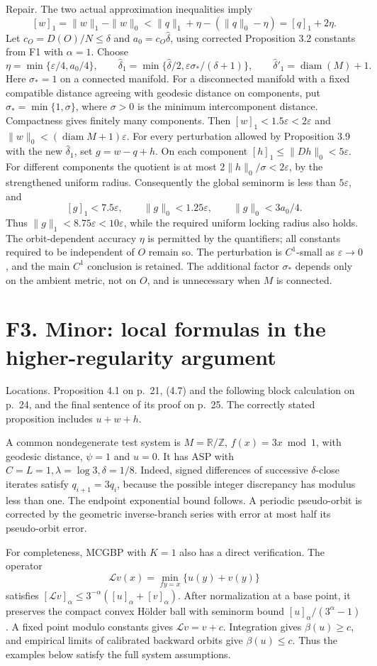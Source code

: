 \documentclass[10pt]{article}
\begin{document}
Repair. The two actual approximation inequalities imply \[[w]_1=\|w\|_1-\|w\|_0
 <\|q\|_1+\eta-(\|q\|_0-\eta)
 =[q]_1+2\eta.\] Let \(c_O=D(O)/N\le\delta\) and \(a_0=c_O\widehat\delta\), using corrected Proposition 3.2 constants from F1 with \(\alpha=1\). Choose \[\eta=\min\{\varepsilon/4,a_0/4\},\qquad
 \widehat\delta_1=\min\{\widehat\delta/2,\varepsilon\sigma_*/(\delta+1)\},
 \qquad \widehat\delta'_1=\operatorname{diam}(M)+1.\] Here \(\sigma_*=1\) on a connected manifold. For a disconnected manifold with a fixed compatible distance agreeing with geodesic distance on components, put \(\sigma_*=\min\{1,\sigma\}\), where \(\sigma>0\) is the minimum intercomponent distance. Compactness gives finitely many components. Then \([w]_1<1.5\varepsilon<2\varepsilon\) and \(\|w\|_0<(\operatorname{diam}M+1)\varepsilon\). For every perturbation allowed by Proposition 3.9 with the new \(\widehat\delta_1\), set \(g=w-q+h\). On each component \([h]_1\le\|Dh\|_0<5\varepsilon\). For different components the quotient is at most \(2\|h\|_0/\sigma<2\varepsilon\), by the strengthened uniform radius. Consequently the global seminorm is less than \(5\varepsilon\), and \[[g]_1<7.5\varepsilon,\qquad
 \|g\|_0<1.25\varepsilon,\qquad
 \|g\|_0<3a_0/4.\] Thus \(\|g\|_1<8.75\varepsilon<10\varepsilon\), while the required uniform locking radius also holds. The orbit-dependent accuracy \(\eta\) is permitted by the quantifiers; all constants required to be independent of \(O\) remain so. The perturbation is \(C^1\)-small as \(\varepsilon\to0\), and the main \(C^1\) conclusion is retained. The additional factor \(\sigma_*\) depends only on the ambient metric, not on \(O\), and is unnecessary when \(M\) is connected.\par
\section*{F3. Minor: local formulas in the higher-regularity argument}
Locations. Proposition 4.1 on p. 21, (4.7) and the following block calculation on p. 24, and the final sentence of its proof on p. 25. The correctly stated proposition includes \(u+w+h\).\par
A common nondegenerate test system is \(M=\mathbb R/\mathbb Z\), \(f(x)=3x\bmod1\), with geodesic distance, \(\psi=1\) and \(u=0\). It has ASP with \(C=L=1,\lambda=\log3,\delta=1/8\). Indeed, signed differences of successive \(\delta\)-close iterates satisfy \(q_{i+1}=3q_i\), because the possible integer discrepancy has modulus less than one. The endpoint exponential bound follows. A periodic pseudo-orbit is corrected by the geometric inverse-branch series with error at most half its pseudo-orbit error.\par
For completeness, MCGBP with \(K=1\) also has a direct verification. The operator \[\mathcal Lv(x)=\min_{fy=x}\{u(y)+v(y)\}\] satisfies \([\mathcal Lv]_\alpha\le3^{-\alpha}([u]_\alpha+[v]_\alpha)\). After normalization at a base point, it preserves the compact convex Hölder ball with seminorm bound \([u]_\alpha/(3^\alpha-1)\). A fixed point modulo constants gives \(\mathcal Lv=v+c\). Integration gives \(\beta(u)\ge c\), and empirical limits of calibrated backward orbits give \(\beta(u)\le c\). Thus the examples below satisfy the full system assumptions.\par
\end{document}
